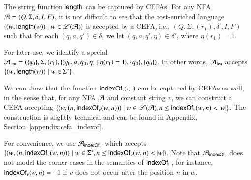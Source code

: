 \begin{example}\label{exm:len}
	The string function $\mathsf{length}$ can be captured by CEFAs. For any NFA $\mathcal{A}=(Q, \Sigma,  \delta, I, F)$, it is not difficult to see that the cost-enriched language $\{(w, \mathsf{length}(w)) \mid w\in \mathscr{L}(\mathcal{A})\}$ is accepted by a CEFA, i.e., 
	$(Q, \Sigma, (r_1), \delta', I, F)$  %
	such that for each $(q, a, q')\in \delta$, we let $(q, a, q', \eta)\in \delta'$, where $\eta(r_1) = 1$. 
	
	For later use, we identify a special $\mathcal{A}_{\rm len}= (\{q_0\}, \Sigma, (r_1), \{(q_0, a, q_0, \eta) \mid \eta(r_1) = 1\}, \{q_0\}, \{q_0\})$. In other words, $\mathcal{A}_{\rm len}$ accepts $\{(w, \mathsf{length}(w)) \mid w\in \Sigma^*\}$.
\end{example}

We can show that the function $\mathsf{indexOf}_v(\cdot, \cdot)$ can be captured by CEFAs as well, in the sense that, for any NFA $\mathcal{A}$ and constant string $v$, we can construct a CEFA %
accepting $\left\{(w, (n, \mathsf{indexOf}_v(w, n)))\mid w\in \mathscr{L}(\mathcal{A}), n \le \mathsf{indexOf}_v(w, n) < |w| \right\}$. %
The construction is slightly technical and can be found in Appendix, Section~\ref{appendix:cefa_indexof}.

For convenience, we use $\mathcal{A}_{\mathsf{indexOf}_v}$ which accepts $\{(w, (n, \mathsf{indexOf}_v(w, n)))\mid w\in \Sigma^*, n \le \mathsf{indexOf}_v(w, n) < |w| \}$. %
Note that $\mathcal{A}_{\mathsf{indexOf}_v}$ does not model the corner cases in the semantics of $\mathsf{indexOf}_v$, for instance, $\mathsf{indexOf}_v(w, n) = -1$ if $v$ does not occur after the position $n$ in $w$.

